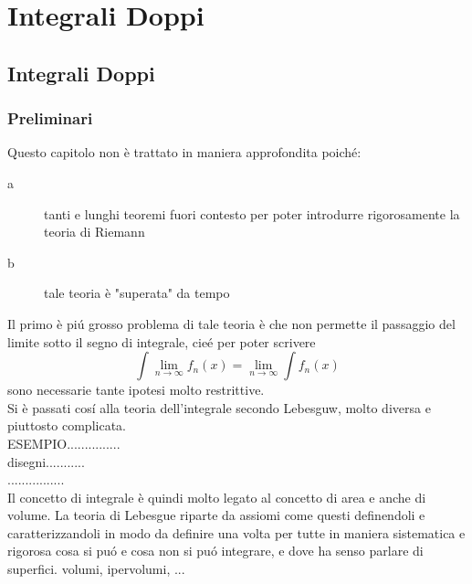 \part{Integrali Doppi}
\chapter{Integrali Doppi}
\section{Preliminari}
Questo capitolo non è trattato in maniera approfondita poich\'e:
\begin{description}
	\item[a] tanti e lunghi teoremi fuori contesto per poter introdurre rigorosamente la teoria di Riemann
	\item[b] tale teoria è "superata" da tempo
\end{description}
Il primo è pi\'u grosso problema di tale teoria è che non permette il passaggio del limite sotto il segno di integrale, cie\'e per poter scrivere 
$$ \int\lim\limits_{n\to\infty}f_n(x) = \lim\limits_{n\to\infty}\int f_n(x)$$ sono necessarie tante ipotesi molto restrittive.\\
Si è passati cos\'i alla teoria dell'integrale secondo Lebesguw, molto diversa e piuttosto complicata.\\
ESEMPIO...............\\
disegni...........\\
................\\
Il concetto di integrale è quindi molto legato al concetto di area e anche di volume. La teoria di Lebesgue riparte da assiomi come questi definendoli e caratterizzandoli in modo da definire una volta per tutte in maniera sistematica e rigorosa cosa si pu\'o e cosa non si pu\'o integrare, e dove ha senso parlare di superfici. volumi, ipervolumi, ... 
